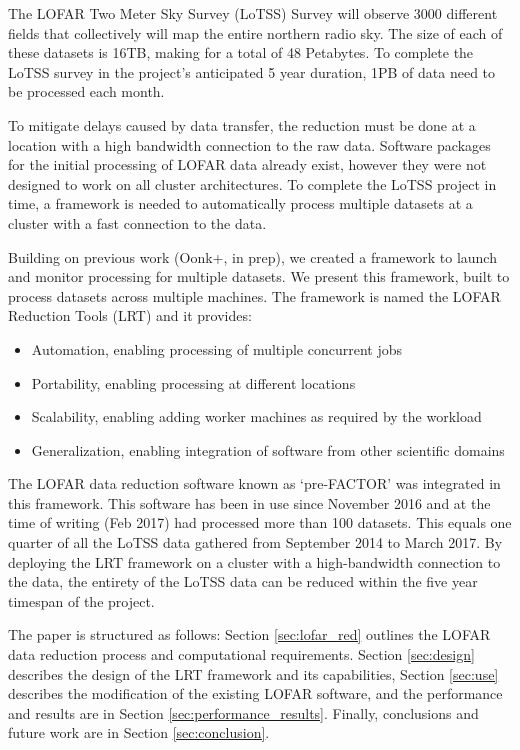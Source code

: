 The LOFAR Two Meter Sky Survey (LoTSS) Survey\cite{lotss} will observe 3000 different fields that collectively will map the entire northern radio sky. The size of each of these datasets is 16TB, making for a total of 48 Petabytes. To complete the LoTSS survey in the project's anticipated 5 year duration, 1PB of data need to be processed each month. 

To mitigate delays caused by data transfer, the reduction must be done at a location with a high bandwidth connection to the raw data. Software packages for the initial processing of LOFAR data already exist\cite{van2016lofar}, however they were not designed to work on all cluster architectures. To complete the LoTSS project in time, a framework is needed to automatically process multiple datasets at a cluster with a fast connection to the data. 

Building on previous work (Oonk+, in prep), we created a framework to launch and monitor processing for multiple datasets. We present this framework, built to process datasets across multiple machines. The framework is named the LOFAR Reduction Tools (LRT) and it provides:

\begin{itemize}[noitemsep,topsep=0pt]
 \item Automation, enabling processing of multiple concurrent jobs
 \item Portability, enabling processing at different locations 
 \item Scalability, enabling adding worker machines as required by the workload
 \item Generalization, enabling integration of software from other scientific domains
\end{itemize}

The LOFAR data reduction software known as `pre-FACTOR'\cite{prefactor} was integrated in this framework. This software has been in use since November 2016 and at the time of writing (Feb 2017) had processed more than 100 datasets. This equals one quarter of all the LoTSS data gathered from September 2014 to March 2017. By deploying the LRT framework on a cluster with a high-bandwidth connection to the data, the entirety of the LoTSS data can be reduced within the five year timespan of the project. 

The paper is structured as follows: Section \ref{sec:lofar_red} outlines the LOFAR data reduction process and computational requirements. Section \ref{sec:design} describes the design of the LRT framework and its capabilities, Section \ref{sec:use} describes the modification of the existing LOFAR software, and the performance and results are in Section \ref{sec:performance_results}. Finally, conclusions  and future work are in Section \ref{sec:conclusion}.

